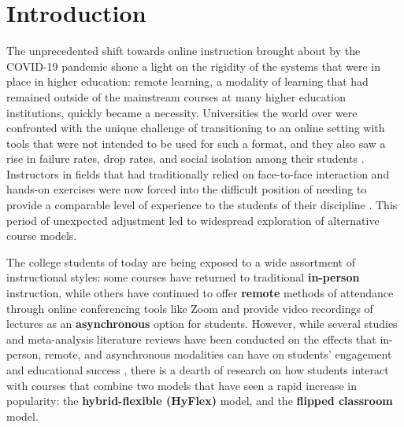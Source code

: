 \chapter{Introduction}

The unprecedented shift towards online instruction brought about by the COVID-19 pandemic shone a light on the rigidity of the systems that were in place in higher education: remote learning, a modality of learning that had remained outside of the mainstream courses at many higher education institutions, quickly became a necessity. Universities the world over were confronted with the unique challenge of transitioning to an online setting with tools that were not intended to be used for such a format, and they also saw a rise in failure rates, drop rates, and social isolation among their students \cite{lewis2021exploring}. Instructors in fields that had traditionally relied on face-to-face interaction and hands-on exercises were now forced into the difficult position of needing to provide a comparable level of experience to the students of their discipline \cite{gaur2020challenges, serhan2020transitioning}. This period of unexpected adjustment led to widespread exploration of alternative course models.

The college students of today are being exposed to a wide assortment of instructional styles: some courses have returned to traditional \textbf{in-person} instruction, while others have continued to offer \textbf{remote} methods of attendance through online conferencing tools like Zoom and provide video recordings of lectures as an \textbf{asynchronous} option for students. However, while several studies and meta-analysis literature reviews have been conducted on the effects that in-person, remote, and asynchronous modalities can have on students' engagement and educational success \cite{bali2018students, el2007students, jackson2008student, liu2016effectiveness, sharifrazi2019students}, there is a dearth of research on how students interact with courses that combine two models that have seen a rapid increase in popularity: the \textbf{hybrid-flexible (HyFlex)} model, and the \textbf{flipped classroom} model.

